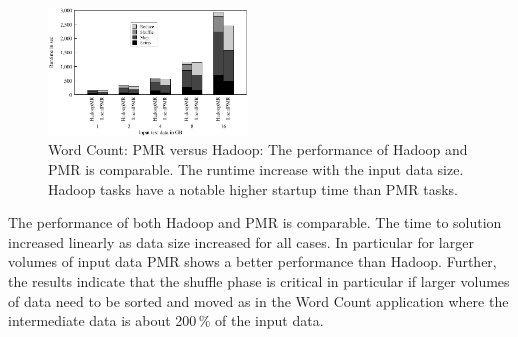 \documentclass{acm_proc_article-sp}
\newcommand{\pnote}[1]{ {\textcolor{magenta} { ***pradeep: #1 }}}
\newcommand{\pnote}[1]{}
\begin{document}
\begin{figure}[ht]
	\centering
		\includegraphics[width=0.47\textwidth]{figures/wordcount_hmr_pmr.pdf}
\caption{Word Count: PMR versus Hadoop: The performance of Hadoop and PMR is 
comparable. The runtime increase with the input data size. Hadoop tasks have a 
notable higher startup time than PMR tasks.} 	
\label{fig:figures_wordcount_hadoopmr_pmr}
\end{figure}		
	
The performance of both Hadoop and PMR is comparable. The time to solution 
increased linearly as data size increased for all cases. In particular for 
larger volumes of input data PMR shows a better performance than Hadoop. 
Further, the results indicate that the shuffle phase is critical in particular 
if larger volumes of data need to be sorted and moved as in the Word Count 
application where the intermediate data is about 200\,\% of the input data.



\end{document}
